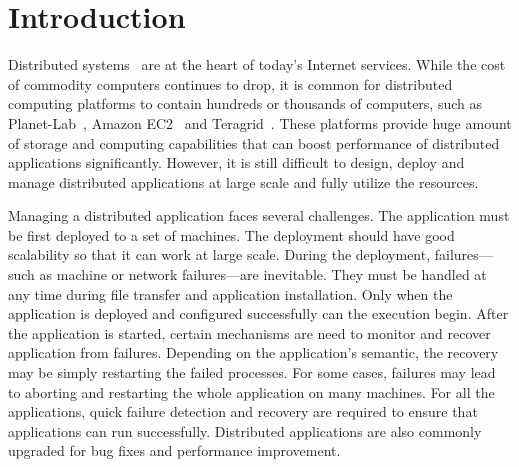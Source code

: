 \section{Introduction}


Distributed systems~\cite{Ghemawat2003, DeCandia2007} are at
the heart of today's Internet services. While the cost of
commodity computers continues to drop, it is common for
distributed computing platforms to contain hundreds or
thousands of computers, such as
Planet-Lab~\cite{Bavier2004}, Amazon
EC2~\cite{Garfinkel2007} and Teragrid~\cite{Catlett2002}.
These platforms provide huge amount of storage and computing
capabilities that can boost performance of distributed
applications significantly. However, it is still difficult
to design, deploy and manage distributed applications at
large scale and fully utilize the resources.


Managing a distributed application faces several challenges.
The application must be first deployed to a set of machines.
The deployment should have good scalability so that it can
work at large scale. During the deployment, failures---such
as machine or network failures---are inevitable. They must
be handled at any time during file transfer and application
installation. Only when the application is deployed and
configured successfully can the execution begin. After the
application is started, certain mechanisms are need to
monitor and recover application from failures.  Depending on
the application's semantic, the recovery may be simply
restarting the failed processes. For some cases, failures
may lead to aborting and restarting the whole application on
many machines. For all the applications, quick failure
detection and recovery are required to ensure that
applications can run successfully. Distributed applications
are also commonly upgraded for bug fixes and performance
improvement.

